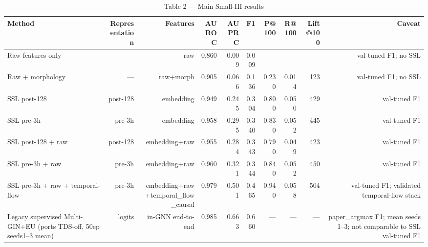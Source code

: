 \begin{table}[t]
\centering
\caption{Table 2 — Main Small-HI results}
\begin{tabular}{lrrrrrrrrr}
\toprule
Method & Representation & Features & AUROC & AUPRC & F1 & P@100 & R@100 & Lift@100 & Caveat \\
\midrule
Raw features only & --- & raw & 0.860 & 0.009 & 0.009 & --- & --- & --- & val-tuned F1; no SSL \\
Raw + morphology & --- & raw+morph & 0.905 & 0.066 & 0.136 & 0.230 & 0.014 & 123 & val-tuned F1; no SSL \\
SSL post-128 & post-128 & embedding & 0.949 & 0.245 & 0.304 & 0.800 & 0.050 & 429 & val-tuned F1 \\
SSL pre-3h & pre-3h & embedding & 0.958 & 0.295 & 0.340 & 0.830 & 0.052 & 445 & val-tuned F1 \\
SSL post-128 + raw & post-128 & embedding+raw & 0.955 & 0.284 & 0.343 & 0.790 & 0.049 & 423 & val-tuned F1 \\
SSL pre-3h + raw & pre-3h & embedding+raw & 0.960 & 0.321 & 0.344 & 0.840 & 0.052 & 450 & val-tuned F1 \\
SSL pre-3h + raw + temporal-flow & pre-3h & embedding+raw+temporal\_flow\_causal & 0.979 & 0.501 & 0.465 & 0.940 & 0.058 & 504 & val-tuned F1; validated temporal-flow stack \\
Legacy supervised Multi-GIN+EU (ports TDS-off, 50ep seeds1–3 mean) & logits & in-GNN end-to-end & 0.985 & 0.663 & 0.660 & --- & --- & --- & paper\_argmax F1; mean seeds 1–3; not comparable to SSL val-tuned F1 \\
\bottomrule
\end{tabular}
\end{table}

